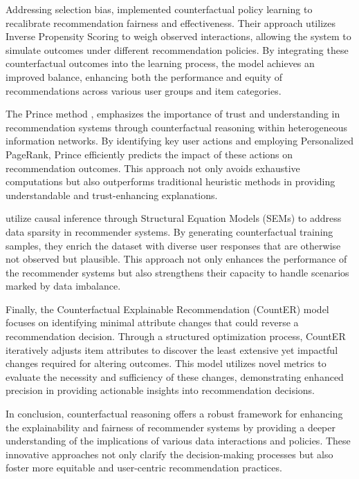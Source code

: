 Addressing selection bias, \parencite{liu_practical_2022} implemented counterfactual policy
learning to recalibrate recommendation fairness and effectiveness. Their approach
utilizes Inverse Propensity Scoring to weigh observed interactions, allowing the
system to simulate outcomes under different recommendation policies. By integrating
these counterfactual outcomes into the learning process, the model achieves an
improved balance, enhancing both the performance and equity of recommendations across
various user groups and item categories.

The Prince method \parencite{ghazimatin_prince_2020}, emphasizes the
importance of trust and understanding in recommendation systems through
counterfactual reasoning within heterogeneous information networks. By identifying
key user actions and employing Personalized PageRank, Prince efficiently
predicts the impact of these actions on recommendation outcomes. This approach not
only avoids exhaustive computations but also outperforms traditional heuristic methods
in providing understandable and trust-enhancing explanations.

\textcite{yang_top-n_2021} utilize causal inference through Structural Equation Models (SEMs)
to address data sparsity in recommender systems. By generating counterfactual training
samples, they enrich the dataset with diverse user responses that are otherwise
not observed but plausible. This approach not only enhances the performance of the
recommender systems but also strengthens their capacity to handle scenarios marked
by data imbalance.

Finally, the Counterfactual Explainable Recommendation (CountER) model \parencite{tan_counterfactual_2021} focuses on identifying minimal attribute changes that could
reverse a recommendation decision. Through a structured optimization process, CountER
iteratively adjusts item attributes to discover the least extensive yet impactful
changes required for altering outcomes. This model utilizes novel metrics to
evaluate the necessity and sufficiency of these changes, demonstrating enhanced precision
in providing actionable insights into recommendation decisions.

In conclusion, counterfactual reasoning offers a robust framework for enhancing
the explainability and fairness of recommender systems by providing a deeper
understanding of the implications of various data interactions and policies. These
innovative approaches not only clarify the decision-making processes but also foster
more equitable and user-centric recommendation practices.

